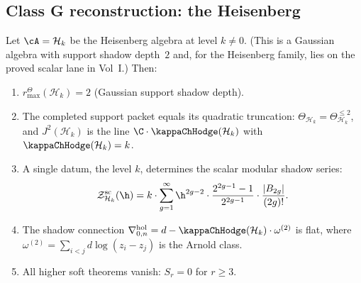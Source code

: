 \subsection{Class G reconstruction: the Heisenberg}

\begin{theorem}
Let $\cA = \mathcal{H}_k$ be the Heisenberg algebra at level $k \neq 0$.
(This is a Gaussian algebra with support shadow depth~$2$ and, for the
Heisenberg family, lies on the proved scalar lane in Vol~I.)
Then:
\begin{enumerate}[label=\textup{(\roman*)}]
\item \(r^\Theta_{\max}(\mathcal{H}_k) = 2\) (Gaussian support shadow depth).
\item The completed support packet equals its quadratic truncation:
 \(\Theta_{\mathcal H_k}=\Theta_{\mathcal H_k}^{\le2}\), and
 \(J^2(\mathcal{H}_k)\) is the line
 \(\C \cdot \kappaChHodge(\mathcal H_k)\) with
 \(\kappaChHodge(\mathcal{H}_k) = k\).
\item A single datum, the level $k$, determines the scalar modular shadow series:
 \begin{equation}
 \mathcal Z^{\mathrm{sc}}_{\mathcal{H}_k}(\h)
 = k \cdot \sum_{g=1}^{\infty} \h^{2g-2} \cdot
 \frac{2^{2g-1}-1}{2^{2g-1}} \cdot \frac{|B_{2g}|}{(2g)!}.
 \end{equation}
\item The shadow connection
\(\nabla^{\mathrm{hol}}_{0,n}
= d - \kappaChHodge(\mathcal H_k)\cdot \omega^{(2)}\)
 is flat, where $\omega^{(2)} = \sum_{i<j} d\log(z_i - z_j)$ is the Arnold class.
\item All higher soft theorems vanish: $S_r = 0$ for $r \geq 3$.
\end{enumerate}
\end{theorem}

